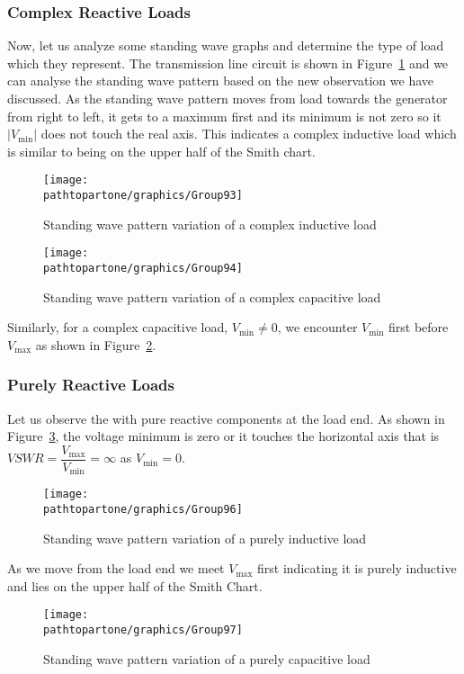 \subsubsection{Complex Reactive Loads}
Now, let us analyze some standing wave graphs and determine the type of load which they represent. The transmission line circuit is shown in Figure~\ref{fig:group93} and we can analyse the standing wave pattern based on the new observation we have discussed. As the standing wave pattern moves from load towards the generator from right to left, it gets to a maximum first and its minimum is not zero so it $|V_\min|$ does not touch the real axis. This indicates a complex inductive load which is similar to being on the upper half of the Smith chart.
\begin{figure}[h]
\centering
\texttt{[image: \\pathtopartone/graphics/Group93]}
\caption{Standing wave pattern variation of a complex inductive load}
\label{fig:group93}
\end{figure}
\begin{figure}[h]
\centering
\texttt{[image: \\pathtopartone/graphics/Group94]}
\caption{Standing wave pattern variation of a complex capacitive load}
\label{fig:group94}
\end{figure}

Similarly, for a complex capacitive load, $V_\min\neq0$, we encounter $V_\min$ first before $V_\max$ as shown in Figure~\ref{fig:group94}. 

\subsubsection{Purely Reactive Loads}
Let us observe the  with pure reactive components at the load end. As shown in Figure~\ref{fig:group96}, the voltage minimum is zero or it touches the horizontal axis that is ${VSWR=\dfrac{V_\max}{V_\min}=\infty}$ as ${V_\min=0}$.
\begin{figure}[h]
\centering
\texttt{[image: \\pathtopartone/graphics/Group96]}
\caption{Standing wave pattern variation of a purely inductive load}
\label{fig:group96}
\end{figure}

As we move from the load end we meet ${V_\max}$ first indicating it is purely inductive and lies on the upper half of the Smith Chart.
\begin{figure}[h]
\centering
\texttt{[image: \\pathtopartone/graphics/Group97]}
\caption{Standing wave pattern variation of a purely capacitive load}
\label{fig:group97}
\end{figure}

